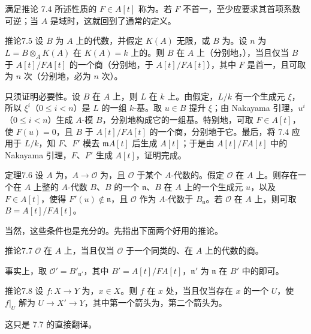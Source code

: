 满足推论 7.4 所述性质的 $F\in A[t]$ 称为。若 $F$ 不首一，至少应要求其首项系数可逆；当 $A$ 是域时，这就回到了通常的定义。
\begin{SGAresult}{推论}{7.5}
设 $B$ 为 $A$ 上的代数，并假定 $K(A)$ 无限，或 $B$ 为。设 $n$ 为 $L=B\otimes_A K(A)$ 在 $K(A)=k$ 上的。则 $B$ 在 $A$ 上（分别地，），当且仅当 $B$ 于 $A[t]/FA[t]$ 的一个商（分别地，于 $A[t]/FA[t]$），其中 $F$ 是首一，且可取为 $n$ 次（分别地，必为 $n$ 次）。
\end{SGAresult}
只须证明必要性。设 $B$ 在 $A$ 上，则 $L$ 在 $k$ 上。由假定，$L/k$ 有一个生成元 $\xi$，所以 $\xi^i$（$0\leq i<n$）是 $L$ 的一组 $k$-基。取 $u\in B$ 提升 $\xi$；由 Nakayama 引理，$u^i$（$0\leq i<n$）生成 $A$-模 $B$，分别地构成它的一组基。特别地，可取 $F\in A[t]$，使 $F(u)=0$，且 $B$ 于 $A[t]/FA[t]$ 的一个商，分别地于它。最后，将 7.4 应用于 $L/k$，知 $F$、$F'$ 模去 $\mathfrak m A[t]$ 后生成 $A[t]$；于是由 $A[t]/FA[t]$ 中的 Nakayama 引理，$F$、$F'$ 生成 $A[t]$，证明完成。
\begin{SGAresult}{定理}{7.6}
设 $A$ 为，$A\to\mathcal O$ 为，且 $\mathcal O$ 于某个 $A$-代数的。假定 $\mathcal O$ 在 $A$ 上。则存在一个在 $A$ 上整的 $A$-代数 $B$、$B$ 的一个 $\mathfrak n$、$B$ 在 $A$ 上的一个生成元 $u$，以及 $F\in A[t]$，使得 $F'(u)\notin\mathfrak n$，且 $\mathcal O$ 作为 $A$-代数于 $B_{\mathfrak n}$。若 $\mathcal O$ 在 $A$ 上，则可取 $B=A[t]/FA[t]$。
\end{SGAresult}
当然，这些条件也是充分的。先指出下面两个好用的推论。
\begin{SGAresult}{推论}{7.7}
$\mathcal O$ 在 $A$ 上，当且仅当 $\mathcal O$ 于一个同类的、在 $A$ 上的代数的商。
\end{SGAresult}
事实上，取 $\mathcal O'=B'_{\mathfrak n'}$，其中 $B'=A[t]/FA[t]$，$\mathfrak n'$ 为 $\mathfrak n$ 在 $B'$ 中的即可。
\begin{SGAresult}{推论}{7.8}
设 $f\colon X\to Y$ 为，$x\in X$。则 $f$ 在 $x$ 处，当且仅当存在 $x$ 的一个 $U$，使 $f|_U$ 解为 $U\to X'\to Y$，其中第一个箭头为，第二个箭头为。
\end{SGAresult}
这只是 7.7 的直接翻译。

